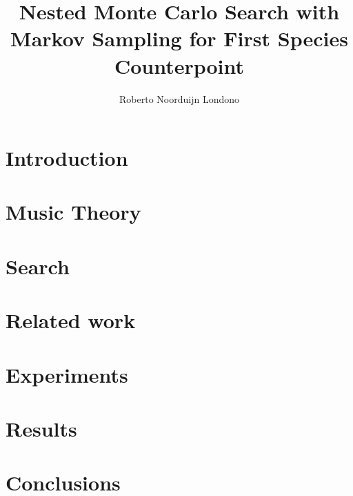 \documentclass{kecsmstr}
\title{Nested Monte Carlo Search with Markov Sampling for First Species Counterpoint}
\author{Roberto Noorduijn Londono}
\begin{document}
\makeheaders {} \maketitle \setcounter{page}{2}
\emptypage

 \emptypage

 \emptypage

\tableofcontents  \emptypage {}

\chapter{Introduction}



\chapter{Music Theory}



\chapter{Search}



\chapter{Related work}

\chapter{Experiments}

\chapter{Results}

\chapter{Conclusions}

 \emptypage

\appendix




 \emptypage

\end{document}
